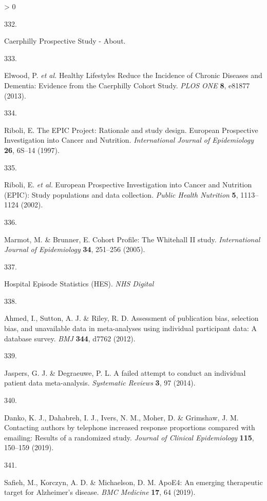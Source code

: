 \documentclass[a4paper, twoside]{templates/ociamthesis}
\newlength{\cslhangindent}
\newlength{\csllabelwidth}
\newenvironment{CSLReferences}[3] %
 {%
  \setlength{\parindent}{0pt}
  \ifodd #1 \everypar{\setlength{\hangindent}{\cslhangindent}}\ignorespaces\fi
  \ifnum #2 > 0
  \setlength{\parskip}{#2\baselineskip}
  \fi
 }%
 {}
\newcommand{\CSLLeftMargin}[1]{\parbox[t]{\maxof{\widthof{#1}}{\csllabelwidth}}{#1}}
\newcommand{\CSLRightInline}[1]{\parbox[t]{\linewidth - \csllabelwidth}{#1}}
\begin{document}
\begin{CSLReferences}{0}{0}
\leavevmode\hypertarget{ref-zotero-15398}{}%
\CSLLeftMargin{332. }
\CSLRightInline{Caerphilly {Prospective Study} - {About}.}

\leavevmode\hypertarget{ref-elwood2013}{}%
\CSLLeftMargin{333. }
\CSLRightInline{Elwood, P. \emph{et al.} Healthy {Lifestyles Reduce} the {Incidence} of {Chronic Diseases} and {Dementia}: Evidence from the {Caerphilly Cohort Study}. \emph{PLOS ONE} \textbf{8}, e81877 (2013).}

\leavevmode\hypertarget{ref-riboli1997}{}%
\CSLLeftMargin{334. }
\CSLRightInline{Riboli, E. The {EPIC Project}: Rationale and study design. {European Prospective Investigation} into {Cancer} and {Nutrition}. \emph{International Journal of Epidemiology} \textbf{26}, 6S--14 (1997).}

\leavevmode\hypertarget{ref-riboli2002}{}%
\CSLLeftMargin{335. }
\CSLRightInline{Riboli, E. \emph{et al.} European {Prospective Investigation} into {Cancer} and {Nutrition} ({EPIC}): Study populations and data collection. \emph{Public Health Nutrition} \textbf{5}, 1113--1124 (2002).}

\leavevmode\hypertarget{ref-marmot2005}{}%
\CSLLeftMargin{336. }
\CSLRightInline{Marmot, M. \& Brunner, E. Cohort {Profile}: The {Whitehall II} study. \emph{International Journal of Epidemiology} \textbf{34}, 251--256 (2005).}

\leavevmode\hypertarget{ref-zotero-15403}{}%
\CSLLeftMargin{337. }
\CSLRightInline{Hospital {Episode Statistics} ({HES}). \emph{NHS Digital}}

\leavevmode\hypertarget{ref-ahmed2012}{}%
\CSLLeftMargin{338. }
\CSLRightInline{Ahmed, I., Sutton, A. J. \& Riley, R. D. Assessment of publication bias, selection bias, and unavailable data in meta-analyses using individual participant data: A database survey. \emph{BMJ} \textbf{344}, d7762 (2012).}

\leavevmode\hypertarget{ref-jaspers2014}{}%
\CSLLeftMargin{339. }
\CSLRightInline{Jaspers, G. J. \& Degraeuwe, P. L. A failed attempt to conduct an individual patient data meta-analysis. \emph{Systematic Reviews} \textbf{3}, 97 (2014).}

\leavevmode\hypertarget{ref-danko2019}{}%
\CSLLeftMargin{340. }
\CSLRightInline{Danko, K. J., Dahabreh, I. J., Ivers, N. M., Moher, D. \& Grimshaw, J. M. Contacting authors by telephone increased response proportions compared with emailing: Results of a randomized study. \emph{Journal of Clinical Epidemiology} \textbf{115}, 150--159 (2019).}

\leavevmode\hypertarget{ref-safieh2019}{}%
\CSLLeftMargin{341. }
\CSLRightInline{Safieh, M., Korczyn, A. D. \& Michaelson, D. M. {ApoE4}: An emerging therapeutic target for {Alzheimer}'s disease. \emph{BMC Medicine} \textbf{17}, 64 (2019).}


\end{CSLReferences}
\end{document}
